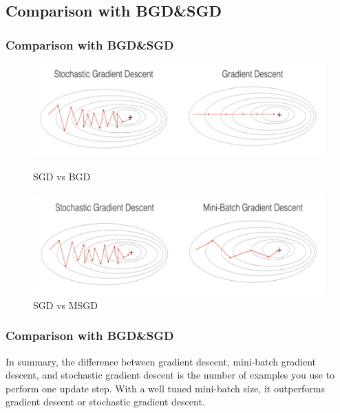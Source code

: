 \documentclass[cjk]{beamer}
\begin{document}
\subsection{Comparison with BGD\&SGD}
\begin{frame}
\frametitle{Comparison with BGD\&SGD}
\begin{figure}
	\begin{minipage}[t]{0.6\linewidth} %
		\centering
		\includegraphics[width= \textwidth]{c1.png}
		\caption{SGD vs BGD}
		\label{fig:side:a}
	\end{minipage}%

	\begin{minipage}[t]{0.6\linewidth}
		\centering
		\includegraphics[width= \textwidth]{c2.png}
		\caption{SGD vs MSGD}
	\end{minipage}
\end{figure}
\end{frame}

\begin{frame}
\frametitle{Comparison with BGD\&SGD}
\begin{block}{}
In summary, the difference between gradient descent, mini-batch gradient descent, and stochastic gradient descent is the number of examples you use to perform one update step. With a well tuned mini-batch size, it outperforms gradient descent or stochastic gradient descent.
\end{block}
\end{frame}
\end{document}
